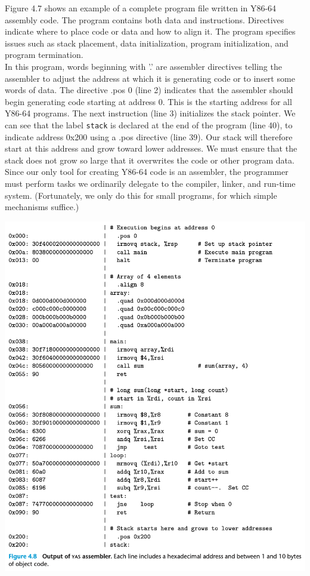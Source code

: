 \documentclass[11pt]{article}
\begin{document}
Figure 4.7 shows an example of a complete program file written in Y86-64 assembly code. The program contains both data and instructions. Directives indicate where to place code or data and how to align it. The program specifies issues such as stack placement, data initialization, program initialization, and program termination.\\

In this program, words beginning with '.' are assembler directives telling the assembler to adjust the address at which it is generating code or to insert some words of data. The directive .pos 0 (line 2) indicates that the assembler should begin generating code starting at address 0. This is the starting address for all Y86-64 programs. The next instruction (line 3) initializes the stack pointer. We can see that the label \texttt{stack} is declared at the end of the program (line 40), to indicate address 0x200 using a .pos directive (line 39). Our stack will therefore start at this address and grow toward lower addresses. We must ensure that the stack does not grow so large that it overwrites the code or other program data.\\

Since our only tool for creating Y86-64 code is an assembler, the programmer must perform tasks we ordinarily delegate to the compiler, linker, and run-time system. (Fortunately, we only do this for small programs, for which simple mechanisms suffice.)\\

\begin{center}
\includegraphics[width=.9\linewidth]{pics/figure4.8-output-of-yas-assembler.png}
\end{center}
\end{document}
